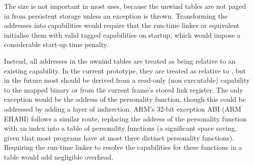 The size is not important in most uses, because the unwind tables are not paged in from persistent storage unless an exception is thrown.
Transforming the addresses into capabilities would require that the run-time linker or equivalent initialise them with valid tagged capabilities on startup, which would impose a considerable start-up time penalty.

Instead, all addresses in the uwnind tables are treated as being relative to an existing capability.
In the current prototype, they are treated as relative to , but in the future most should be derived from a read-only (non executable) capability to the mapped binary or from the current frame's stored link register.
The only exception would be the address of the personality function, though this could be addressed by adding a layer of indirection.
ARM's 32-bit exception ABI (ARM EHABI) follows a similar route, replacing the address of the personality function with an index into a table of personality functions (a significant space saving, given that most programs have at most three distinct personality functions).
Requiring the run-time linker to resolve the capabilities for these functions in a table would add negligible overhead.
